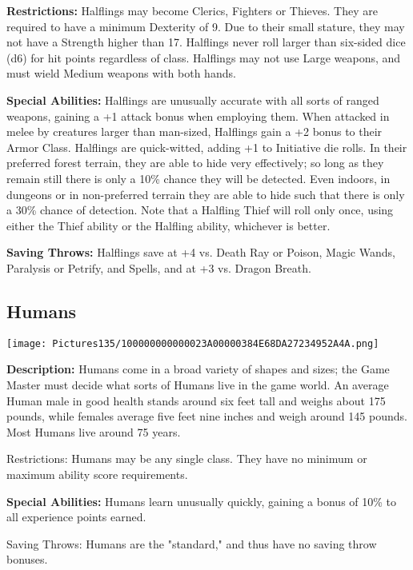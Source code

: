\documentclass[a4paper,twoside,openany,10pt]{book}
\begin{document}
\begin{multicols}{2}
\textbf{Restrictions: } Halflings may become Clerics, Fighters or Thieves. They are required to have a minimum Dexterity of 9. Due to their small stature, they may not have a Strength higher than 17. Halflings never roll larger than six-sided dice (d6) for hit points regardless of class. Halflings may not use Large weapons, and must wield Medium weapons with both hands.

\textbf{Special Abilities:} Halflings are unusually accurate with all sorts of ranged weapons, gaining a +1 attack bonus when employing them. When attacked in melee by creatures larger than man-sized, Halflings gain a +2 bonus to their Armor Class. Halflings are quick-witted, adding +1 to Initiative die rolls. In their preferred forest terrain, they are able to hide very effectively; so long as they remain still there is only a 10\% chance they will be detected. Even indoors, in dungeons or in non-preferred terrain they are able to hide such that there is only a 30\% chance of detection. Note that a Halfling Thief will roll only once, using either the Thief ability or the Halfling ability, whichever is better.

\textbf{Saving Throws:} Halflings save at +4 vs. Death Ray or Poison, Magic Wands, Paralysis or Petrify, and Spells, and at +3 vs. Dragon Breath.

\subsection{Humans}\label{humans}

\begin{center}
	\texttt{[image: Pictures135/100000000000023A00000384E68DA27234952A4A.png]}
\end{center}\medskip

\textbf{Description:} Humans come in a broad variety of shapes and sizes; the Game Master must decide what sorts of Humans live in the game world. An average Human male in good health stands around six feet tall and weighs about 175 pounds, while females average five feet nine inches and weigh around 145 pounds. Most Humans live around 75 years.

Restrictions: Humans may be any single class. They have no minimum or maximum ability score requirements.

\textbf{Special Abilities:} Humans learn unusually quickly, gaining a bonus of 10\% to all experience points earned.

Saving Throws: Humans are the "standard," and thus have no saving throw bonuses.



\end{multicols}
\end{document}
